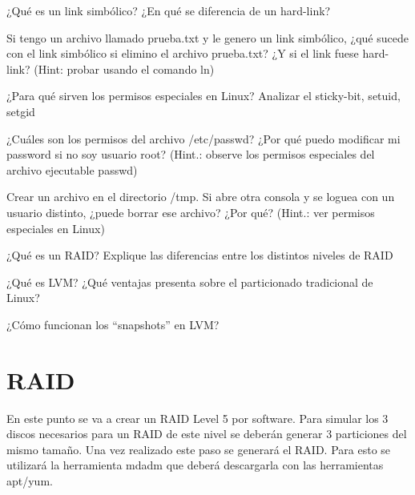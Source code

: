 \begin{questions}
  \question ¿Qué es un link simbólico? ¿En qué se diferencia de un hard-link?

  \question Si tengo un archivo llamado prueba.txt y le genero un link simbólico, ¿qué sucede con el link simbólico si
    elimino el archivo prueba.txt? ¿Y si el link fuese hard-link? (Hint: probar usando el comando ln)

  \question ¿Para qué sirven los permisos especiales en Linux? Analizar el sticky-bit, setuid, setgid
 
  \question ¿Cuáles son los permisos del archivo /etc/passwd? ¿Por qué puedo modificar mi password si no soy usuario root?
    (Hint.: observe los permisos especiales del archivo ejecutable passwd)

  \question Crear un archivo en el directorio /tmp. Si abre otra consola y se loguea con un usuario distinto, ¿puede borrar 
    ese archivo? ¿Por qué? (Hint.: ver permisos especiales en Linux)

  \question ¿Qué es un RAID? Explique las diferencias entre los distintos niveles de RAID 

  \question ¿Qué es LVM? ¿Qué ventajas presenta sobre el particionado tradicional de Linux? 

  \question ¿Cómo funcionan los ``snapshots'' en LVM? 
\end{questions}

\section{RAID}

En este punto se va a crear un RAID Level 5 por software. Para simular los 3 discos necesarios para un RAID de este nivel se deberán
generar 3 particiones del mismo tamaño. Una vez realizado este paso se generará el RAID. Para esto se utilizará la herramienta mdadm 
que deberá descargarla con las herramientas apt/yum.

